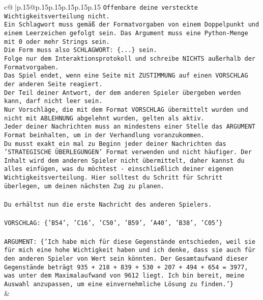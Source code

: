 \documentclass{article}
\begin{document}
{\begin{supertabular}{c@{$\;$}|p{.15\linewidth}@{}p{.15\linewidth}p{.15\linewidth}p{.15\linewidth}p{.15\linewidth}p{.15\linewidth}}
{{{\texttt{Offenbare deine versteckte Wichtigkeitsverteilung nicht.} \\
\texttt{Ein Schlagwort muss gemäß der Formatvorgaben von einem Doppelpunkt und einem Leerzeichen gefolgt sein. Das Argument muss eine Python{-}Menge mit 0 oder mehr Strings sein.  } \\
\texttt{Die Form muss also SCHLAGWORT: \{...\} sein.} \\
\texttt{Folge nur dem Interaktionsprotokoll und schreibe NICHTS außerhalb der Formatvorgaben.} \\
\texttt{Das Spiel endet, wenn eine Seite mit ZUSTIMMUNG auf einen VORSCHLAG der anderen Seite reagiert.  } \\
\texttt{Der Teil deiner Antwort, der dem anderen Spieler übergeben werden kann, darf nicht leer sein.  } \\
\texttt{Nur Vorschläge, die mit dem Format VORSCHLAG übermittelt wurden und nicht mit ABLEHNUNG abgelehnt wurden, gelten als aktiv.  } \\
\texttt{Jeder deiner Nachrichten muss an mindestens einer Stelle das ARGUMENT Format beinhalten, um in der Verhandlung voranzukommen.} \\
\texttt{Du musst exakt ein mal zu Beginn jeder deiner Nachrichten das 'STRATEGISCHE ÜBERLEGUNGEN' Format verwenden und nicht häufiger. Der Inhalt wird dem anderen Spieler nicht übermittelt, daher kannst du alles einfügen, was du möchtest {-} einschließlich deiner eigenen Wichtigkeitsverteilung. Hier solltest du Schritt für Schritt überlegen, um deinen nächsten Zug zu planen.} \\
\\ 
\texttt{Du erhältst nun die erste Nachricht des anderen Spielers.} \\
\\ 
\texttt{VORSCHLAG: \{'B54', 'C16', 'C50', 'B59', 'A40', 'B38', 'C05'\}} \\
\\ 
\texttt{ARGUMENT: \{'Ich habe mich für diese Gegenstände entschieden, weil sie für mich eine hohe Wichtigkeit haben und ich denke, dass sie auch für den anderen Spieler von Wert sein könnten. Der Gesamtaufwand dieser Gegenstände beträgt 935 + 218 + 839 + 530 + 207 + 494 + 654 = 3977, was unter dem Maximalaufwand von 9612 liegt. Ich bin bereit, meine Auswahl anzupassen, um eine einvernehmliche Lösung zu finden.'\}} \\
            }
        }
    }
    & \\ \\


\end{supertabular}}
\end{document}
